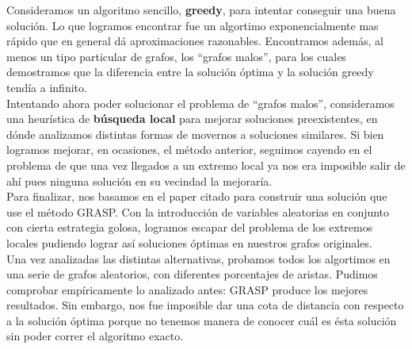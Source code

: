 Consideramos un algoritmo sencillo, \textbf{greedy}, para intentar conseguir una buena solución. Lo que logramos encontrar fue un algortimo exponencialmente mas rápido que en general dá aproximaciones razonables. Encontramos además, al menos un tipo particular de grafos, los ``grafos malos'', para los cuales demostramos que la diferencia entre la solución óptima y la solución greedy tendía a infinito. \\

Intentando ahora poder solucionar el problema de ``grafos malos'', consideramos una heurística de \textbf{búsqueda local} para mejorar soluciones preexistentes, en dónde analizamos distintas formas de movernos a soluciones similares. Si bien logramos mejorar, en ocasiones, el método anterior, seguimos cayendo en el problema de que una vez llegados a un extremo local ya nos era imposible salir de ahí pues ninguna solución en su vecindad la mejoraría. \\

Para finalizar, nos basamos en el paper citado \cite{paper_grasp} para construir una solución que use el método GRASP. Con la introducción de variables aleatorias en conjunto con cierta estrategia golosa, logramos escapar del problema de los extremos locales pudiendo lograr así soluciones óptimas en nuestros grafos originales.  \\

Una vez analizadas las distintas alternativas, probamos todos los algortimos en una serie de grafos aleatorios, con diferentes porcentajes de aristas. Pudimos comprobar empíricamente lo analizado antes: GRASP produce los mejores resultados. Sin embargo, nos fue imposible dar una cota de distancia con respecto a la solución óptima porque no tenemos manera de conocer cuál es ésta solución sin poder correr el algoritmo exacto. \\
